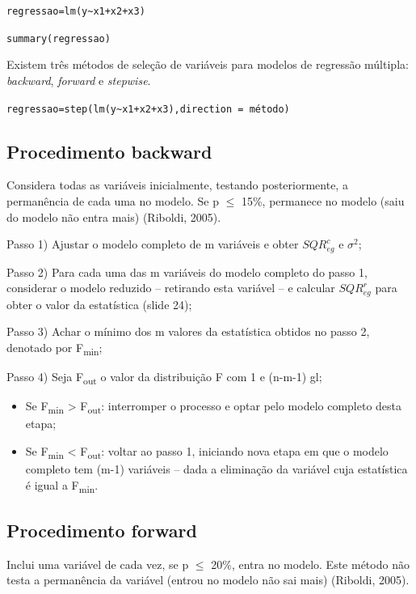\documentclass[12pt,brazil,oneside]{book}
\begin{document}
\texttt{regressao=lm(y\textasciitilde{}x1+x2+x3)}

\texttt{summary(regressao)}

Existem três métodos de seleção de variáveis para modelos de regressão
múltipla: \emph{backward}, \emph{forward} e \emph{stepwise}.

\texttt{regressao=step(lm(y\textasciitilde{}x1+x2+x3),direction\ =\ \textquotesingle{}método\textquotesingle{})}

\hypertarget{procedimento-backward}{%
\subsection{Procedimento backward}\label{procedimento-backward}}

Considera todas as variáveis inicialmente, testando posteriormente, a
permanência de cada uma no modelo. Se p \(\leq\) 15\%, permanece no
modelo (saiu do modelo não entra mais) (Riboldi, 2005).

Passo 1) Ajustar o modelo completo de m variáveis e obter
\(SQR^{c}_{eg}\) e \(\sigma^{2}\);

Passo 2) Para cada uma das m variáveis do modelo completo do passo 1,
considerar o modelo reduzido -- retirando esta variável -- e calcular
\(SQR^{r}_{eg}\) para obter o valor da estatística (slide 24);

Passo 3) Achar o mínimo dos m valores da estatística obtidos no passo 2,
denotado por F\textsubscript{min};

Passo 4) Seja F\textsubscript{out} o valor da distribuição F com 1 e
(n-m-1) gl;

\begin{itemize}
\item
  Se F\textsubscript{min} \textgreater{} F\textsubscript{out}:
  interromper o processo e optar pelo modelo completo desta etapa;
\item
  Se F\textsubscript{min} \textless{} F\textsubscript{out}: voltar ao
  passo 1, iniciando nova etapa em que o modelo completo tem (m-1)
  variáveis -- dada a eliminação da variável cuja estatística é igual a
  F\textsubscript{min}.
\end{itemize}

\hypertarget{procedimento-forward}{%
\subsection{Procedimento forward}\label{procedimento-forward}}

Inclui uma variável de cada vez, se p \(\leq\) 20\%, entra no modelo.
Este método não testa a permanência da variável (entrou no modelo não
sai mais) (Riboldi, 2005).
\end{document}
